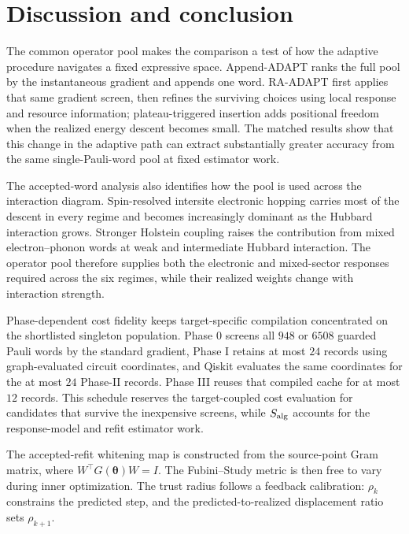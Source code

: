\documentclass[
  reprint,
  amsmath,
  amssymb,
  aps,
  pra,
  nofootinbib,
  superscriptaddress,
  floatfix
]{revtex4-2}
\begin{document}
\section{Discussion and conclusion}
\label{sec:discussion}
\label{sec:conclusion}

The common operator pool makes the comparison a test of how the adaptive
procedure navigates a fixed expressive space. Append-ADAPT ranks the full pool
by the instantaneous gradient and appends one word. RA-ADAPT first applies
that same gradient screen, then refines the surviving choices using local
response and resource information; plateau-triggered insertion adds positional
freedom when the realized energy descent becomes small. The matched results
show that this change in the adaptive path can extract substantially greater
accuracy from the same single-Pauli-word pool at fixed estimator work.

The accepted-word analysis also identifies how the pool is used across the
interaction diagram. Spin-resolved intersite electronic hopping carries most
of the descent in every regime and becomes increasingly dominant as the
Hubbard interaction grows. Stronger Holstein coupling raises the contribution
from mixed electron--phonon words at weak and intermediate Hubbard
interaction. The operator pool therefore supplies both the electronic and
mixed-sector responses required across the six regimes, while their realized
weights change with interaction strength.

Phase-dependent cost fidelity keeps target-specific compilation concentrated
on the shortlisted singleton population. Phase 0 screens all \(948\) or
\(6508\) guarded Pauli words by the standard gradient, Phase I retains at most
\(24\) records using graph-evaluated circuit coordinates, and Qiskit evaluates
the same coordinates for the at most \(24\) Phase-II records. Phase III reuses
that compiled cache for at most \(12\) records. This schedule reserves the
target-coupled cost evaluation for candidates that survive the inexpensive
screens, while \(S_{\rm alg}\) accounts for the response-model and refit
estimator work.

The accepted-refit whitening map is constructed from the source-point Gram
matrix, where \(W^\top G(\boldsymbol\theta)W=I\). The Fubini--Study metric is
then free to vary during inner optimization. The trust radius follows a
feedback calibration: \(\rho_k\) constrains the predicted step, and the
predicted-to-realized displacement ratio sets \(\rho_{k+1}\).
\end{document}
